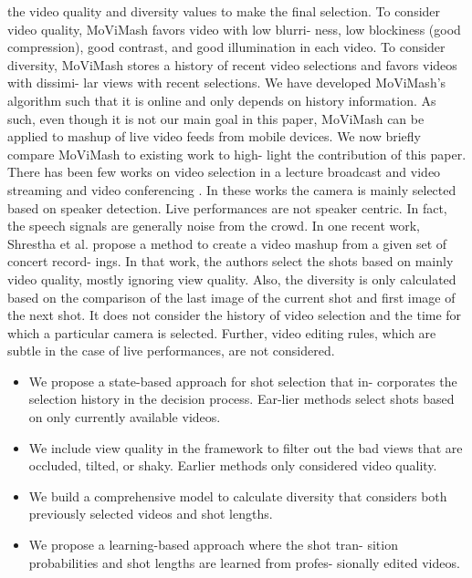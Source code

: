 \documentclass{sig-alternate}
\begin{document}
the video quality and diversity values to make the final selection.
To consider video quality, MoViMash favors video with low blurri-
ness, low blockiness (good compression), good contrast, and good
illumination in each video. To consider diversity, MoViMash stores
a history of recent video selections and favors videos with dissimi-
lar views with recent selections.
We have developed MoViMash’s algorithm such that it is online
and only depends on history information. As such, even though
it is not our main goal in this paper, MoViMash can be applied to
mashup of live video feeds from mobile devices.
We now briefly compare MoViMash to existing work to high-
light the contribution of this paper. There has been few works on
video selection in a lecture broadcast and video streaming \cite{salas:twentyone} \cite{salas:six}
and video conferencing \cite{salas:three}. In these works the camera is mainly
selected based on speaker detection. Live performances are not
speaker centric. In fact, the speech signals are generally noise from
the crowd. In one recent work, Shrestha et al. \cite{salas:fifteen} propose a
method to create a video mashup from a given set of concert record-
ings. In that work, the authors select the shots based on mainly
video quality, mostly ignoring view quality. Also, the diversity is
only calculated based on the comparison of the last image of the
current shot and first image of the next shot. It does not consider
the history of video selection and the time for which a particular
camera is selected. Further, video editing rules, which are subtle in
the case of live performances, are not considered.


 \begin{itemize} 
\item We propose a state-based approach for shot selection that in-
corporates the selection history in the decision process. Ear-lier methods select shots based on only currently available
videos.
\item We include view quality in the framework to filter out the
bad views that are occluded, tilted, or shaky. Earlier methods
only considered video quality.
\item We build a comprehensive model to calculate diversity that
considers both previously selected videos and shot lengths.
\item We propose a learning-based approach where the shot tran-
sition probabilities and shot lengths are learned from profes-
sionally edited videos.
 \end{itemize} 
\end{document}
